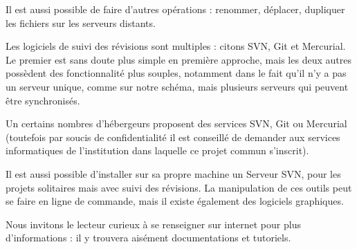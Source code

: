 Il est aussi possible de faire d'autres opérations : renommer, déplacer, dupliquer les fichiers sur les serveurs distants.

Les logiciels de suivi des révisions sont multiples : citons SVN, Git et Mercurial. Le premier est sans doute plus simple en première approche, mais les deux autres possèdent des fonctionnalité plus souples, notamment dans le fait qu'il n'y a pas un serveur unique, comme sur notre schéma, mais plusieurs serveurs qui peuvent être synchronisés.

Un certains nombres d'hébergeurs proposent des services SVN, Git ou Mercurial (toutefois par soucis de confidentialité il est conseillé de demander aux services informatiques de l'institution dans laquelle ce projet commun s'inscrit). 

Il est aussi possible d'installer sur sa propre machine un Serveur SVN, pour les projets solitaires mais avec suivi des révisions.
La manipulation de ces outils peut se faire en ligne de commande, mais il existe également des logiciels graphiques.

Nous invitons le lecteur curieux à se renseigner sur internet pour plus d'informations : il y trouvera aisément documentations et tutoriels.